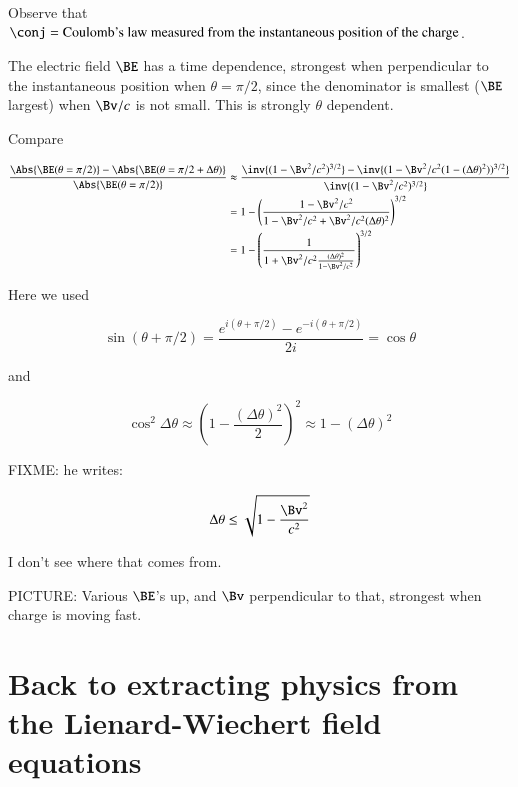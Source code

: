 Observe that $\conj = \text{Coulomb's law measured from the instantaneous position of the charge}$.

The electric field $\BE$ has a time dependence, strongest when perpendicular to the instantaneous position when $\theta = \pi/2$, since the denominator is smallest ($\BE$ largest) when $\Bv/c$ is not small.  This is strongly $\theta$ dependent.

Compare

\begin{align*}
\frac{\Abs{\BE(\theta = \pi/2)} - \Abs{\BE(\theta = \pi/2 + \Delta \theta)} }
{
\Abs{\BE(\theta = \pi/2)}
}
&\approx
\frac{
\inv{(1 - \Bv^2/c^2)^{3/2}}
 - \inv{(1 - \Bv^2/c^2(1 - (\Delta \theta)^2))^{3/2}}
}
{
\inv{(1 - \Bv^2/c^2)^{3/2}}
} \\
&=
1 - 
\left(
\frac{1 - \Bv^2/c^2}{
1 - \Bv^2/c^2 + \Bv^2/c^2(\Delta \theta)^2
}
\right)^{3/2} \\
&=
1 - 
\left(
\frac{1}{
1 + \Bv^2/c^2 \frac{(\Delta \theta)^2}{1 - \Bv^2/c^2}
}
\right)^{3/2} \\
\end{align*}

Here we used

\begin{equation}\label{eqn:relativisticElectrodynamicsL19:240}
\sin(\theta + \pi/2) = \frac{e^{i (\theta + \pi/2)} - e^{-i(\theta + \pi/2)}}{2i} = \cos\theta 
\end{equation}

and

\begin{equation}\label{eqn:relativisticElectrodynamicsL19:260}
\cos^2 \Delta \theta \approx \left( 1 - \frac{(\Delta \theta)^2}{2} \right)^2 \approx 1 - (\Delta \theta)^2
\end{equation}

FIXME: he writes:

\begin{equation}\label{eqn:relativisticElectrodynamicsL19:280}
\Delta \theta \le \sqrt{1 - \frac{\Bv^2}{c^2}}
\end{equation}

I don't see where that comes from.

PICTURE: Various $\BE$'s up, and $\Bv$ perpendicular to that, strongest when charge is moving fast.

\section{Back to extracting physics from the Lienard-Wiechert field equations}

